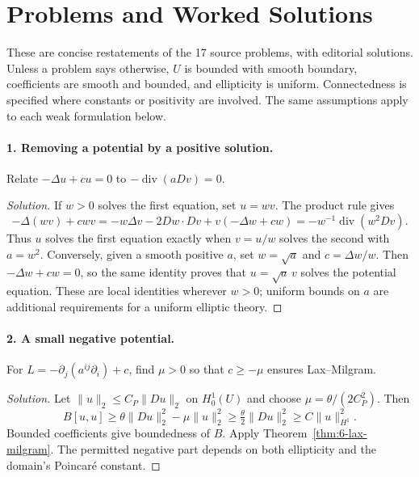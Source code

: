 \Needspace{65mm}
\section{Problems and Worked Solutions}
\label{sec:6-6}
These are concise restatements of the 17 source problems, with editorial
solutions. Unless a problem says otherwise, $U$ is bounded with smooth
boundary, coefficients are smooth and bounded, and ellipticity is uniform.
Connectedness is specified where constants or positivity are involved.
The same assumptions apply to each weak formulation below.

\Needspace{30mm}
\paragraph{1. Removing a potential by a positive solution.}
Relate $-\Delta u+cu=0$ to $-\operatorname{div}(aDv)=0$.
\begin{proof}[Solution]
If $w>0$ solves the first equation, set $u=wv$. The product rule gives
\[
 -\Delta(wv)+cwv
 =-w\Delta v-2Dw\cdot Dv+v(-\Delta w+cw)
 =-w^{-1}\operatorname{div}(w^2Dv).
\]
Thus $u$ solves the first equation exactly when $v=u/w$ solves the
second with $a=w^2$.
Conversely, given a smooth positive $a$, set $w=\sqrt a$ and
$c=\Delta w/w$. Then $-\Delta w+cw=0$, so the same identity proves
that $u=\sqrt a\,v$ solves the potential equation.
These are local identities wherever $w>0$; uniform bounds on $a$
are additional requirements for a uniform elliptic theory.
\end{proof}
\Needspace{45mm}

\Needspace{30mm}

\Needspace{45mm}
\paragraph{2. A small negative potential.}
For $L=-\partial_j(a^{ij}\partial_i)+c$, find $\mu>0$ so that
$c\geq-\mu$ ensures Lax--Milgram.
\begin{proof}[Solution]
Let $\|u\|_2\leq C_P\|Du\|_2$ on $H^1_0(U)$ and choose
$\mu=\theta/(2C_P^2)$. Then
\[
 B[u,u]\geq\theta\|Du\|_2^2-\mu\|u\|_2^2
 \geq\tfrac{\theta}{2}\|Du\|_2^2\geq C\|u\|_{H^1}^2.
\]
Bounded coefficients give boundedness of $B$. Apply
Theorem~\ref{thm:6-lax-milgram}. The permitted negative part depends on
both ellipticity and the domain's Poincar\'e constant.
\end{proof}

